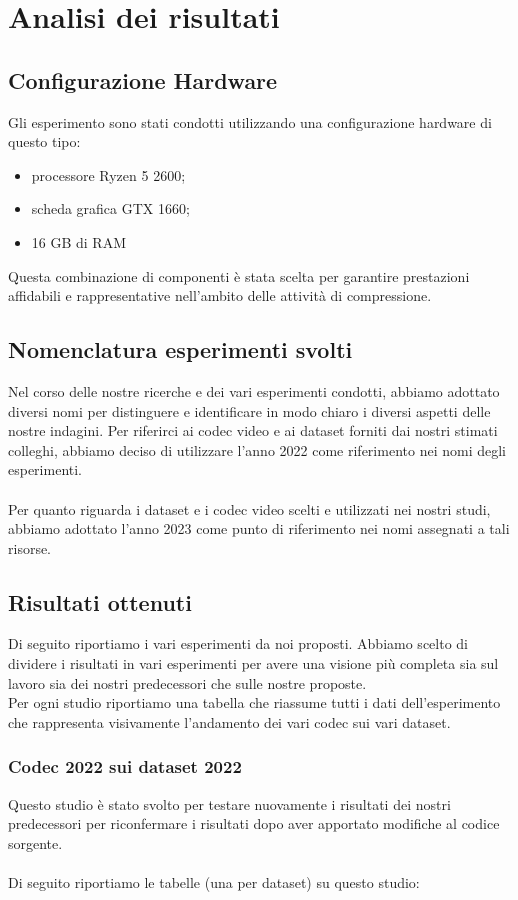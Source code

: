 \chapter{Analisi dei risultati}
\section{Configurazione Hardware}
Gli esperimento sono stati condotti utilizzando una configurazione hardware di questo tipo:
\begin{itemize}
    \item processore Ryzen 5 2600;
    \item scheda grafica GTX 1660;
    \item  16 GB di RAM
\end{itemize}
Questa combinazione di componenti è stata scelta per garantire prestazioni affidabili e rappresentative nell'ambito delle attività di compressione.

\section{Nomenclatura esperimenti svolti}
Nel corso delle nostre ricerche e dei vari esperimenti condotti, abbiamo adottato diversi nomi per distinguere e identificare in modo chiaro i diversi aspetti delle nostre indagini. Per riferirci ai codec video e ai dataset forniti dai nostri stimati colleghi, abbiamo deciso di utilizzare l'anno 2022 come riferimento nei nomi degli esperimenti. 
\\
\\
Per quanto riguarda i dataset e i codec video scelti e utilizzati nei nostri studi, abbiamo adottato l'anno 2023 come punto di riferimento nei nomi assegnati a tali risorse. 
\clearpage
\section{Risultati ottenuti}
Di seguito riportiamo i vari esperimenti da noi proposti. Abbiamo scelto di dividere i risultati in vari esperimenti per avere una visione più completa sia sul lavoro sia dei nostri predecessori che sulle nostre proposte.
\\
Per ogni studio riportiamo una tabella che riassume tutti i dati dell'esperimento  che rappresenta visivamente l'andamento dei vari codec sui vari dataset.

\subsection{Codec 2022 sui dataset 2022}
Questo studio è stato svolto per testare nuovamente i risultati dei nostri predecessori per riconfermare i risultati dopo aver apportato modifiche al codice sorgente.
\\
\\
Di seguito riportiamo le tabelle (una per dataset) su questo studio:

